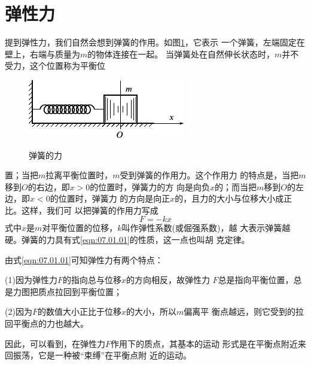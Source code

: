 \section{弹性力}\label{sec:07.01}

提到弹性力，我们自然会想到弹簧的作用。如图\ref{fig:07.01}，它表示
一个弹簧，左端固定在壁上，右端与质量为$ m $的物体连接在一起。
当弹簧处在自然伸长状态时，$ m $并不受力，这个位置称为平衡位
\begin{figure}
  \centering
  \includegraphics{figure/fig07.01}\\[1em]
  \caption{弹簧的力}
  \label{fig:07.01}
\end{figure}
置；当把$ m $拉离平衡位置时，$ m $受到弹簧的作用力。这个作用力
的特点是，当把$ m $移到$ O $的右边，即$  x > 0   $的位置时，弹簧力的方
向是向负$ x $的；而当把$ m $移到$ O $的左边，即$ x<0 $的位置时，弹簧力
的方向是向正$ x $的，且力的大小与位移大小成正比。这样，我们可
以把弹簧的作用力写成
\begin{equation}\label{eqn:07.01.01}
  F = - k x
\end{equation}
式中$ x $是$ m $对平衡位置的位移，$ k $叫作弹性系数(或倔强系数)，越
大表示弹簧越硬。弹簧的力具有式\eqref{eqn:07.01.01}的性质，这一点也叫胡
克定律。

由式\eqref{eqn:07.01.01}可知弹性力有两个特点：

(1)因为弹性力$ F $的指向总与位移$ x $的方向相反，故弹性力
$ F $总是指向平衡位置，总是力图把质点拉回到平衡位置；

(2)因为$ F $的数值大小正比于位移$ x $的大小，所以$ m $偏离平
衡点越远，则它受到的拉回平衡点的力也越大。

因此，可以看到，在弹性力$ F $作用下的质点，其基本的运动
形式是在平衡点附近来回振荡，它是一种被“束缚”在平衡点附
近的运动。

